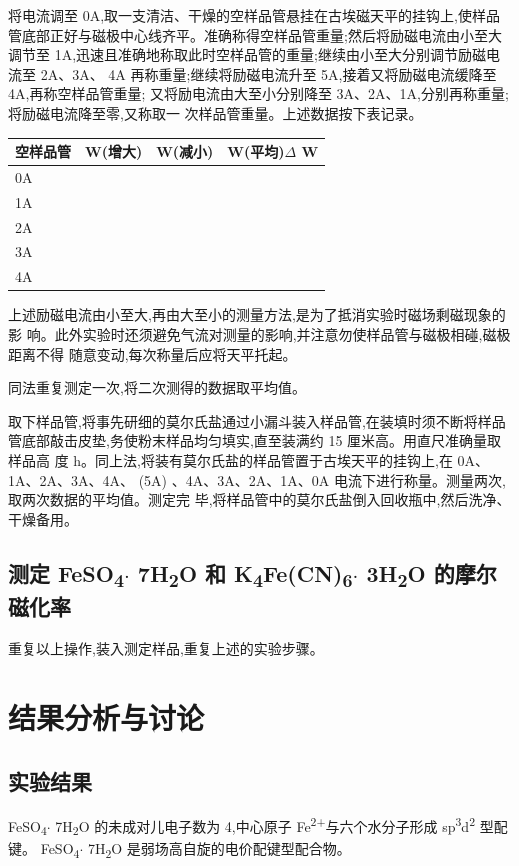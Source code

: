 \documentclass[11pt]{report}
\begin{document}
    将电流调至 0A,取一支清洁、干燥的空样品管悬挂在古埃磁天平的挂钩上,使样品
管底部正好与磁极中心线齐平。准确称得空样品管重量;然后将励磁电流由小至大调节至
1A,迅速且准确地称取此时空样品管的重量;继续由小至大分别调节励磁电流至 2A、3A、
4A 再称重量;继续将励磁电流升至 5A,接着又将励磁电流缓降至 4A,再称空样品管重量;
又将励电流由大至小分别降至 3A、2A、1A,分别再称重量;将励磁电流降至零,又称取一
次样品管重量。上述数据按下表记录。
\begin{center}
\begin{tabular}{llll}
空样品管 & W(增大) & W(减小) & W(平均)\(\Delta\) W\\
\hline
0A &  &  & \\
1A &  &  & \\
2A &  &  & \\
3A &  &  & \\
4A &  &  & \\
\end{tabular}
\end{center}

上述励磁电流由小至大,再由大至小的测量方法,是为了抵消实验时磁场剩磁现象的影
响。此外实验时还须避免气流对测量的影响,并注意勿使样品管与磁极相碰,磁极距离不得
随意变动,每次称量后应将天平托起。

同法重复测定一次,将二次测得的数据取平均值。

取下样品管,将事先研细的莫尔氏盐通过小漏斗装入样品管,在装填时须不断将样品
管底部敲击皮垫,务使粉末样品均匀填实,直至装满约 15 厘米高。用直尺准确量取样品高
度 h。同上法,将装有莫尔氏盐的样品管置于古埃天平的挂钩上,在 0A、1A、2A、3A、4A、
(5A) 、4A、3A、2A、1A、0A 电流下进行称量。测量两次,取两次数据的平均值。测定完
毕,将样品管中的莫尔氏盐倒入回收瓶中,然后洗净、干燥备用。

\section{测定 FeSO\textsubscript{4}\(\cdot\) 7H\textsubscript{2}O 和 K\textsubscript{4}Fe(CN)\textsubscript{6}\(\cdot\) 3H\textsubscript{2}O 的摩尔磁化率}
\label{sec:org8cab36a}
重复以上操作,装入测定样品,重复上述的实验步骤。

\chapter{结果分析与讨论}
\label{sec:org9fa68da}
\section{实验结果}
\label{sec:org05eb916}
   FeSO\textsubscript{4}\(\cdot\) 7H\textsubscript{2}O 的未成对儿电子数为 4,中心原子 Fe\textsuperscript{2+}与六个水分子形成 sp\textsuperscript{3}d\textsuperscript{2} 型配键。
FeSO\textsubscript{4}\(\cdot\) 7H\textsubscript{2}O 是弱场高自旋的电价配键型配合物。
\end{document}

